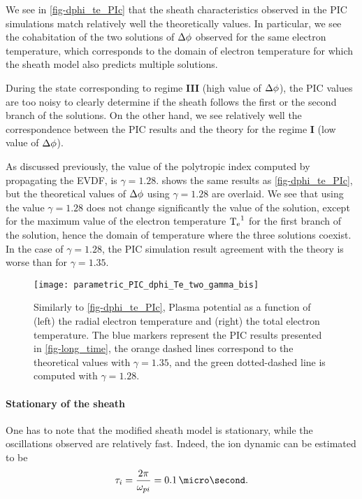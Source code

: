     We see in \cref{fig-dphi_te_PIc} that the sheath characteristics observed in the \ac{PIC}  simulations match relatively well the theoretically values.
    In particular, we see the cohabitation of the two solutions of $\Delta \phi$ observed for the same electron temperature, which corresponds to the domain of electron temperature for which the sheath model also predicts multiple solutions.
    
    During the state corresponding to regime {\bf III} (high value of  $\Delta \phi$), the \ac{PIC} values are too noisy to clearly determine if the sheath follows the first or the second branch of the solutions.
    On the other hand, we see relatively well the correspondence between the \ac{PIC} results and the theory for the regime {\bf I} (low value of $\Delta \phi$).
    
    As discussed previously, the value of the polytropic index computed by propagating the \ac{EVDF}, is $\gamma=1.28$.
     shows the same results as \cref{fig-dphi_te_PIc}, but  the theoretical values of $\Delta \phi$ using $\gamma=1.28$ are overlaid.
    We see that using the value $\gamma=1.28$ does not change significantly the value of the solution, except for the maximum value of the electron temperature $\mathrm{T_e}^1$ for the first branch of the solution, hence the domain of temperature where the three solutions coexist.
    In the case of $\gamma=1.28$, the \ac{PIC} simulation result agreement with the theory is worse than for $\gamma=1.35$.
    
    \begin{figure}[hbt]
      \centering
      \texttt{[image: parametric\_PIC\_dphi\_Te\_two\_gamma\_bis]}
      \caption{Similarly to \cref{fig-dphi_te_PIc}, Plasma potential as a function of (left) the radial electron temperature and (right) the total electron temperature. The blue markers represent the \acs{PIC} results presented in \cref{fig-long_time}, the orange dashed lines correspond to the theoretical values with $\gamma=1.35$, and the green dotted-dashed line is computed with $\gamma=1.28$.}
      \label{fig-dphi_te_PIc2}
    \end{figure}
    
    \paragraph{Stationary of the sheath \\}

    One has to note that the modified sheath model is stationary, while the oscillations observed are relatively fast.
    Indeed, the ion dynamic can be estimated to be
    \begin{equation} \label{eq-ti}
      \tau_i = \frac{2 \pi}{\opi} = 0.1 \,\micro\second.
    \end{equation}
    
